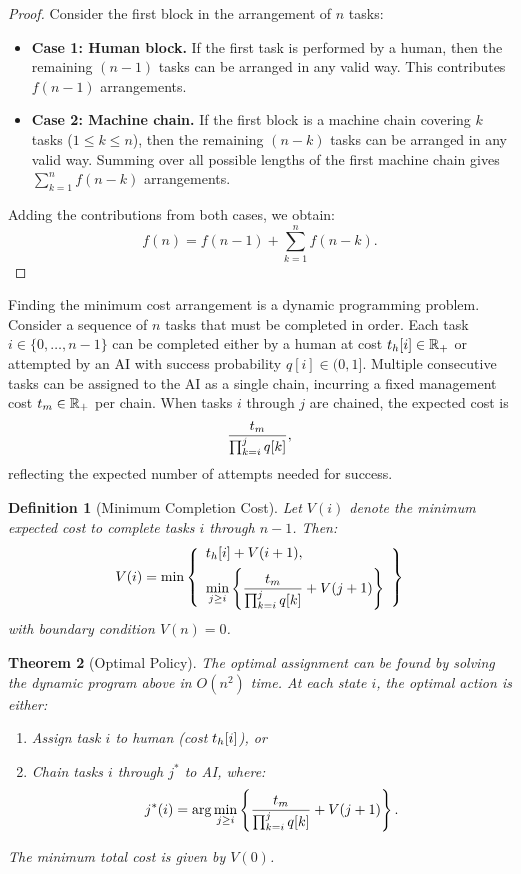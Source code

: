 \documentclass{article}
\theoremstyle{plain}
\theoremstyle{plain}
\newtheorem{theorem}{Theorem}
\newtheorem{definition}[theorem]{Definition}
\begin{document}
\begin{proof}
Consider the first block in the arrangement of \(n\) tasks:
\begin{itemize}
    \item \textbf{Case 1: Human block.} If the first task is performed by a human, then the remaining \((n-1)\) tasks can be arranged in any valid way. This contributes \(f(n-1)\) arrangements.
    \item \textbf{Case 2: Machine chain.} If the first block is a machine chain covering \(k\) tasks (\(1 \leq k \leq n\)), then the remaining \((n-k)\) tasks can be arranged in any valid way. Summing over all possible lengths of the first machine chain gives \(\sum_{k=1}^{n} f(n-k)\) arrangements.
\end{itemize}
Adding the contributions from both cases, we obtain:
\[
f(n) = f(n-1) + \sum_{k=1}^{n} f(n-k).
\]
\end{proof}

Finding the minimum cost arrangement is a dynamic programming problem.
Consider a sequence of \(n\) tasks that must be completed in order. 
Each task \(i \in \{0,\ldots,n-1\}\) can be completed either by a human at cost \(t_{h}[i] \in \mathbb{R}_+\) or attempted by an AI with success probability \(q[i] \in (0,1]\).
Multiple consecutive tasks can be assigned to the AI as a single chain, incurring a fixed management cost \(t_{m} \in \mathbb{R}_+\) per chain. 
When tasks \(i\) through \(j\) are chained, the expected cost is 
\[
\frac{t_{m}}{\prod_{k=i}^j q[k]},
\]
reflecting the expected number of attempts needed for success.

\begin{definition}[Minimum Completion Cost]
Let \(V(i)\) denote the minimum expected cost to complete tasks \(i\) through \(n-1\). Then:
\begin{equation}
V(i) = \min\left\{
\begin{array}{l}
t_{h}[i] + V(i+1), \\[1ex]
\displaystyle\min_{j \geq i} \left\{\frac{t_{m}}{\prod_{k=i}^j q[k]} + V(j+1)\right\}
\end{array}
\right\}
\end{equation}
with boundary condition \(V(n) = 0\).
\end{definition}

\begin{theorem}[Optimal Policy]
The optimal assignment can be found by solving the dynamic program above in \(O(n^2)\) time. At each state \(i\), the optimal action is either:
\begin{enumerate}
    \item Assign task \(i\) to human (cost \(t_{h}[i]\)), or
    \item Chain tasks \(i\) through \(j^*\) to AI, where:
    \begin{equation}
        j^*(i) = \arg\min_{j \geq i} \left\{\frac{t_{m}}{\prod_{k=i}^j q[k]} + V(j+1)\right\}.
    \end{equation}
\end{enumerate}
The minimum total cost is given by \(V(0)\).
\end{theorem}
\end{document}

